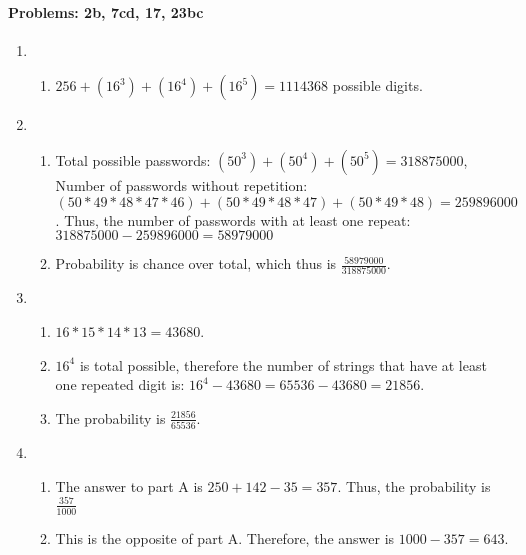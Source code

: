 \documentclass{article}
\makeatletter
\newcommand\setItemnumber[1]{\setcounter{enum\romannumeral\@enumdepth}{\numexpr#1-1\relax}}
\makeatother
\begin{document}
\paragraph{Problems: 2b, 7cd, 17, 23bc}
\begin{enumerate}
    \setItemnumber{2}
    \item 
    \begin{enumerate}
        \setItemnumber{2}
        \item $256 + (16^3) + (16^4) + (16^5) = 1114368$ possible digits.
    \end{enumerate}
    \setItemnumber{7}
    \item 
    \begin{enumerate}
        \setItemnumber{3}
        \item Total possible passwords: $(50^3) + (50^4) + (50^5) = 318875000$, Number of passwords without repetition: $(50*49*48*47*46) + (50*49*48*47) + (50*49*48) = 259896000$. Thus, the number of passwords with at least one repeat: $318875000-259896000=58979000$
        \item Probability is chance over total, which thus is $\frac{58979000}{318875000}$.
    \end{enumerate}
    \setItemnumber{17}
    \item 
    \begin{enumerate}
        \item $16*15*14*13 = 43680$.
        \item $16^4$ is total possible, therefore the number of strings that have at least one repeated digit is: $16^4-43680 = 65536-43680 = 21856$.
        \item The probability is $\frac{21856}{65536}$.
    \end{enumerate}
    \setItemnumber{23}
    \item 
    \begin{enumerate}
        \setItemnumber{2}
        \item The answer to part A is $250+142 - 35 = 357$. Thus, the probability is $\frac{357}{1000}$
        \item This is the opposite of part A. Therefore, the answer is $1000-357 = 643$.
    \end{enumerate}
\end{enumerate}
\end{document}
